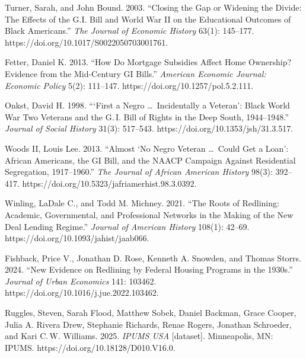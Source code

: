 \documentclass[11pt,answers]{exam}
\begin{document}
\begin{questions}
\begin{thebibliography}{99}
Turner, Sarah, and John Bound. 2003. ``Closing the Gap or Widening the Divide: The Effects of the G.I. Bill and World War II on the Educational Outcomes of Black Americans.'' \textit{The Journal of Economic History} 63(1): 145--177. https://doi.org/10.1017/S0022050703001761.

Fetter, Daniel K. 2013. ``How Do Mortgage Subsidies Affect Home Ownership? Evidence from the Mid-Century GI Bills.'' \textit{American Economic Journal: Economic Policy} 5(2): 111--147. https://doi.org/10.1257/pol.5.2.111.

Onkst, David H. 1998. ```First a Negro \ldots\ Incidentally a Veteran': Black World War Two Veterans and the G.\,I. Bill of Rights in the Deep South, 1944--1948.'' \textit{Journal of Social History} 31(3): 517--543. https://doi.org/10.1353/jsh/31.3.517.

Woods II, Louis Lee. 2013. ``Almost `No Negro Veteran \ldots\ Could Get a Loan': African Americans, the GI Bill, and the NAACP Campaign Against Residential Segregation, 1917--1960.'' \textit{The Journal of African American History} 98(3): 392--417. https://doi.org/10.5323/jafriamerhist.98.3.0392.

Winling, LaDale C., and Todd M. Michney. 2021. ``The Roots of Redlining: Academic, Governmental, and Professional Networks in the Making of the New Deal Lending Regime.'' \textit{Journal of American History} 108(1): 42--69. https://doi.org/10.1093/jahist/jaab066.

Fishback, Price V., Jonathan D. Rose, Kenneth A. Snowden, and Thomas Storrs. 2024. ``New Evidence on Redlining by Federal Housing Programs in the 1930s.'' \textit{Journal of Urban Economics} 141: 103462. https://doi.org/10.1016/j.jue.2022.103462.

Ruggles, Steven, Sarah Flood, Matthew Sobek, Daniel Backman, Grace Cooper, Julia A. Rivera Drew, Stephanie Richards, Renae Rogers, Jonathan Schroeder, and Kari C.\,W. Williams. 2025. \textit{IPUMS USA} [dataset]. Minneapolis, MN: IPUMS. https://doi.org/10.18128/D010.V16.0.

\end{thebibliography}


\end{questions}
\end{document}
